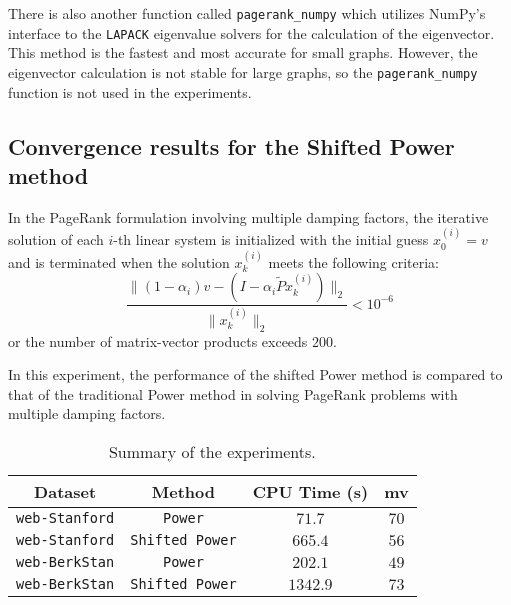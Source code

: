 \noindent There is also another function called \texttt{pagerank\_numpy} which utilizes NumPy's interface to the \texttt{LAPACK} eigenvalue solvers for the calculation of the eigenvector. This method is the fastest and most accurate for small graphs. However, the eigenvector calculation is not stable for large graphs, so the \texttt{pagerank\_numpy} function is not used in the experiments.

\subsection{Convergence results for the Shifted Power method}

In the PageRank formulation involving multiple damping factors, the iterative solution of each $i$-th linear system is initialized with the initial guess $x_0^{(i)} = v$ and is terminated when the solution $x_k^{(i)}$ meets the following criteria:
\begin{equation*}
    \frac{\lVert (1 - \alpha_i)v - (I - \alpha_i \tilde P x_k^{(i)}) \rVert_2}{\lVert x_k^{(i)} \rVert_2} < 10^{-6}
\end{equation*}
or the number of matrix-vector products exceeds $200$. \vspace*{0.5cm}

\noindent In this experiment, the performance of the shifted Power method is compared to that of the traditional Power method in solving PageRank problems with multiple damping factors.

\begin{table}[h]
\centering
\begin{tabular}{|c|c|c|c|}
\hline
\textbf{Dataset} & \textbf{Method} & \textbf{CPU Time (s)} & \textbf{mv} \\ \hline
\texttt{web-Stanford} & \texttt{Power} & $71.7$ & $70$  \\ \hline
\texttt{web-Stanford} & \texttt{Shifted Power} & $665.4$ & $56$ \\ \hline

\hline

\texttt{web-BerkStan} & \texttt{Power} & $202.1$ & $49$  \\ \hline
\texttt{web-BerkStan} & \texttt{Shifted Power} & $1342.9$ & $73$ \\ \hline
\end{tabular}
\caption{Summary of the experiments.}
\label{tab:results}
\end{table}

